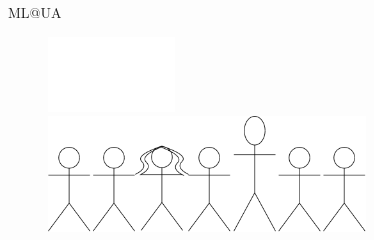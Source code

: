 \begin{frame}{ML@UA}
    \begin{figure}
        \centering
        \includegraphics[width=0.3\textwidth]{img/white_space.png}
        \vspace{5cm}
        \includegraphics[width=0.75\textwidth]{img/ml-at-ua.png}
    \end{figure}
\end{frame}
